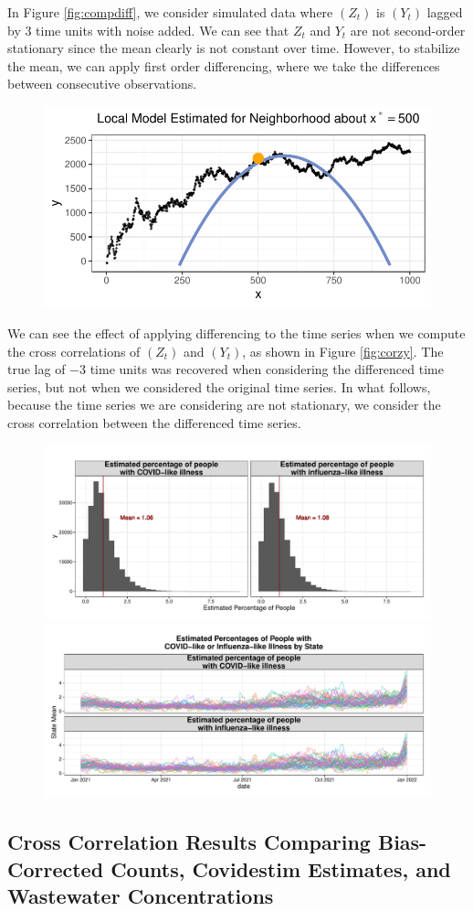 \documentclass[12pt,twoside]{smiththesis}
\begin{document}
In Figure \ref{fig:compdiff}, we consider simulated data where \((Z_t)\) is \((Y_t)\) lagged by 3 time units with noise added. We can see that \(Z_t\) and \(Y_t\) are not second-order stationary since the mean clearly is not constant over time. However, to stabilize the mean, we can apply first order differencing, where we take the differences between consecutive observations.
\begin{figure}
\includegraphics[width=1\linewidth]{thesis_files/figure-latex/unnamed-chunk-27-1} \caption{\label{fig:compdiff}}\label{fig:unnamed-chunk-27}
\end{figure}
We can see the effect of applying differencing to the time series when we compute the cross correlations of \((Z_t)\) and \((Y_t)\), as shown in Figure \ref{fig:corzy}. The true lag of \(-3\) time units was recovered when considering the differenced time series, but not when we considered the original time series. In what follows, because the time series we are considering are not stationary, we consider the cross correlation between the differenced time series.
\vspace{5 cm}
\begin{figure}
\includegraphics[width=0.45\linewidth]{thesis_files/figure-latex/unnamed-chunk-28-1} \includegraphics[width=0.45\linewidth]{thesis_files/figure-latex/unnamed-chunk-28-2} \caption{\label{fig:corzy}}\label{fig:unnamed-chunk-28}
\end{figure}
\hypertarget{cross-correlation-results-comparing-bias-corrected-counts-covidestim-estimates-and-wastewater-concentrations}{%
\subsection{Cross Correlation Results Comparing Bias-Corrected Counts, Covidestim Estimates, and Wastewater Concentrations}\label{cross-correlation-results-comparing-bias-corrected-counts-covidestim-estimates-and-wastewater-concentrations}}
\end{document}
